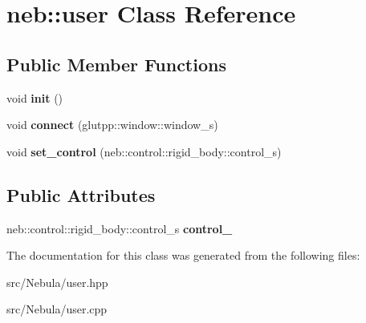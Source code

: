 \hypertarget{classneb_1_1user}{\section{neb\-:\-:user \-Class \-Reference}
\label{classneb_1_1user}
}
\subsection*{\-Public \-Member \-Functions}
\begin{DoxyCompactItemize}
\item 
\hypertarget{classneb_1_1user_a03537b4a3dbb21efa368fcf846384dd5}{void {\bfseries init} ()}\label{classneb_1_1user_a03537b4a3dbb21efa368fcf846384dd5}

\item 
\hypertarget{classneb_1_1user_a4bbd0003c3ba2ef7f25579784cbcb6f5}{void {\bfseries connect} (glutpp\-::window\-::window\-\_\-s)}\label{classneb_1_1user_a4bbd0003c3ba2ef7f25579784cbcb6f5}

\item 
\hypertarget{classneb_1_1user_ae6295dcc8ac8e664cedc8591c28257d0}{void {\bfseries set\-\_\-control} (neb\-::control\-::rigid\-\_\-body\-::control\-\_\-s)}\label{classneb_1_1user_ae6295dcc8ac8e664cedc8591c28257d0}

\end{DoxyCompactItemize}
\subsection*{\-Public \-Attributes}
\begin{DoxyCompactItemize}
\item 
\hypertarget{classneb_1_1user_a66992175b55bcc61803d87d19f1327f8}{neb\-::control\-::rigid\-\_\-body\-::control\-\_\-s {\bfseries control\-\_\-}}\label{classneb_1_1user_a66992175b55bcc61803d87d19f1327f8}

\end{DoxyCompactItemize}


\-The documentation for this class was generated from the following files\-:\begin{DoxyCompactItemize}
\item 
src/\-Nebula/user.\-hpp\item 
src/\-Nebula/user.\-cpp\end{DoxyCompactItemize}
